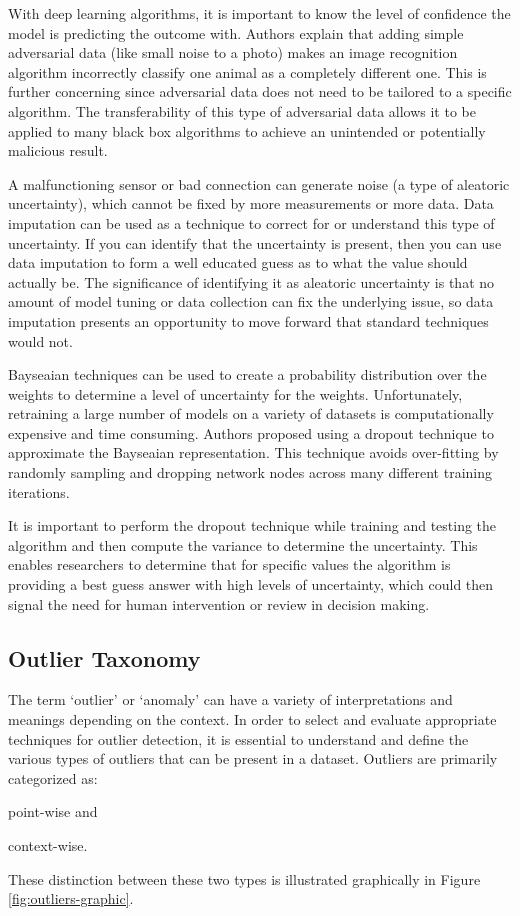 With deep learning algorithms, it is important to know the level of confidence the model is predicting the outcome with. Authors \cite{explaining-adversarial-examples} explain that adding simple adversarial data (like small noise to a photo) makes an image recognition algorithm incorrectly classify one animal as a completely different one. This is further concerning since adversarial data does not need to be tailored to a specific algorithm. The transferability of this type of adversarial data allows it to be applied to many black box algorithms to achieve an unintended or potentially malicious result.

A malfunctioning sensor or bad connection can generate noise (a type of aleatoric uncertainty), which cannot be fixed by more measurements or more data. Data imputation can be used as a technique to correct for or understand this type of uncertainty. If you can identify that the uncertainty is present, then you can use data imputation to form a well educated guess as to what the value should actually be. The significance of identifying it as aleatoric uncertainty is that no amount of model tuning or data collection can fix the underlying issue, so data imputation presents an opportunity to move forward that standard techniques would not.

Bayseaian techniques can be used to create a probability distribution over the weights to determine a level of uncertainty for the weights. Unfortunately, retraining a large number of models on a variety of datasets is computationally expensive and time consuming. Authors \cite{gal2016dropout} proposed using a dropout technique to approximate the Bayseaian representation. This technique avoids over-fitting by randomly sampling and dropping network nodes across many different training iterations.

It is important to perform the dropout technique while training and testing the algorithm and then compute the variance to determine the uncertainty. This enables researchers to determine that for specific values the algorithm is providing a best guess answer with high levels of uncertainty, which could then signal the need for human intervention or review in decision making.

\subsection{Outlier Taxonomy}

The term `outlier' or `anomaly' can have a variety of interpretations and meanings depending on the context. In order to select and evaluate appropriate techniques for outlier detection, it is essential to understand and define the various types of outliers that can be present in a dataset. Outliers are primarily categorized as:
\begin{inlinelist}
    \item point-wise and
    \item context-wise.
\end{inlinelist}
These distinction between these two types is illustrated graphically in Figure \ref{fig:outliers-graphic}.

